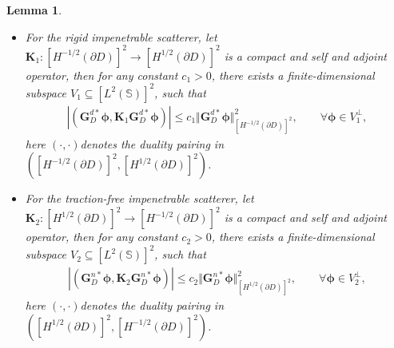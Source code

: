 \documentclass[11pt,reqno,twoside]{amsart}
\newtheorem{lem}{Lemma}[section]
\theoremstyle{definition}
\theoremstyle{remark}
\numberwithin{equation}{section}
\begin{document}
	\begin{lem}\label{DatatoPatternProperty}
		\mbox{}
	\begin{itemize}
	  \item [(1).] For the rigid impenetrable scatterer, let $\mathbf K_1:\left[H^{-1/2}\left(\partial D\right) \right] ^2 \to \left[H^{1/2}\left(\partial D\right) \right] ^2$ is a compact and self and adjoint operator, then for any constant $c_1>0$, there exists a finite-dimensional subspace $V_1 \subseteq \left[L^2\left(\mathbb S\right) \right] ^2$, such that
	\begin{align*}%
		\left|\left( \mathbf G_D^{d*} \mathbf {\phi} ,\mathbf {K}_1\mathbf{G}_D^{d*} \mathbf {\phi}\right) \right| \leq c_1\Vert \mathbf G_D^{d*} \mathbf \phi\Vert _{\left[H^{-1/2}\left(\partial D\right) \right] ^2} ^2, \qquad \forall \mathbf {\phi} \in V_1^\perp,
	\end{align*}
	here $\left( \cdot,\cdot\right) $denotes the duality pairing in $\left( \left[H^{-1/2}\left(\partial D\right) \right] ^2 ,\left[H^{1/2}\left(\partial D\right) \right] ^2\right) $.
	\item [(2).] For the traction-free impenetrable scatterer, let $\mathbf K_2:\left[H^{1/2}\left(\partial D\right) \right] ^2 \to \left[H^{-1/2}\left(\partial D\right) \right] ^2$ is a compact and self and adjoint operator, then for any constant $c_2>0$, there exists a finite-dimensional subspace $V_2 \subseteq \left[L^2\left(\mathbb S\right) \right] ^2$, such that
	\begin{align*}%
		\left|\left( \mathbf G_D^{n*} \mathbf {\phi} ,\mathbf {K}_2\mathbf {G}_D^{n*} \mathbf {\phi}\right) \right| \leq c_2\Vert \mathbf G_D^{n*} \mathbf \phi\Vert _{\left[H^{1/2}\left(\partial D\right) \right] ^2} ^2, \qquad \forall \mathbf {\phi} \in V_2^\perp,
	\end{align*}
	here $\left( \cdot,\cdot\right) $denotes the duality pairing in $\left( \left[H^{1/2}\left(\partial D\right) \right] ^2 ,\left[H^{-1/2}\left(\partial D\right) \right] ^2\right) $.
	\end{itemize}
	\end{lem}
\end{document}
